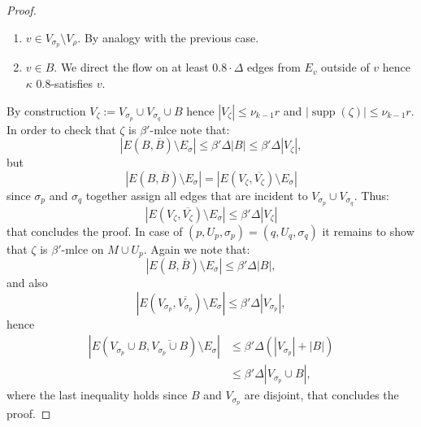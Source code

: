 \documentclass[10pt,a4paper]{article}
\newcommand{\supp}{\operatorname{supp}}
\begin{document}
\begin{proof}
\begin{enumerate}
Note that if $\sigma_p=\sigma_q$, then we $0.8$-satisfy $v$.
\item $v\in V_{\sigma_p}\setminus V_\rho$. By analogy with the previous case.
\item $v\in B$. We direct the flow on at least $0.8\cdot\Delta$ edges from $E_v$ outside of $v$ hence $\kappa$ $0.8$-satisfies $v$.
\end{enumerate}
By construction $V_\zeta:=V_{\sigma_p}\cup V_{\sigma_q}\cup B$ hence $|V_\zeta|\le\nu_{k-1}r$ and $|\supp(\zeta)|\le\nu_{k-1}r$. In order to check that $\zeta$ is $\beta'$-mlce note that:
\[|E(B,\overline B)\setminus E_\sigma|\le\beta'\Delta|B|\le\beta'\Delta|V_\zeta|,\]
but
\[|E(B,\overline B)\setminus E_\sigma|=|E(V_\zeta,\overline{V_\zeta})\setminus E_\sigma|\]
since $\sigma_p$ and $\sigma_q$ together assign all edges that are incident to $V_{\sigma_p}\cup V_{\sigma_q}$. Thus:
\[|E(V_\zeta,\overline{V_\zeta})\setminus E_\sigma|\le\beta'\Delta|V_\zeta|\]
that concludes the proof.
In case of $(p,U_p,\sigma_p)=(q,U_q,\sigma_q)$ it remains to show that $\zeta$ is $\beta'$-mlce on $M\cup U_p$. Again we note that:
\[|E(B,\overline B)\setminus E_\sigma|\le\beta'\Delta|B|,\]
and also
\[|E(V_{\sigma_p},\overline{V_{\sigma_p}})\setminus E_\sigma|\le\beta'\Delta|V_{\sigma_p}|,\]
hence
\begin{align*}
|E(V_{\sigma_p}\cup B,\overline{V_{\sigma_p}\cup B})\setminus E_\sigma|
&\le\beta'\Delta(|V_{\sigma_p}|+|B|)\\
&\le\beta'\Delta|V_{\sigma_p}\cup B|,
\end{align*}
where the last inequality holds since $B$ and $V_{\sigma_p}$ are disjoint, that concludes the proof.
\end{proof}
\end{document}
